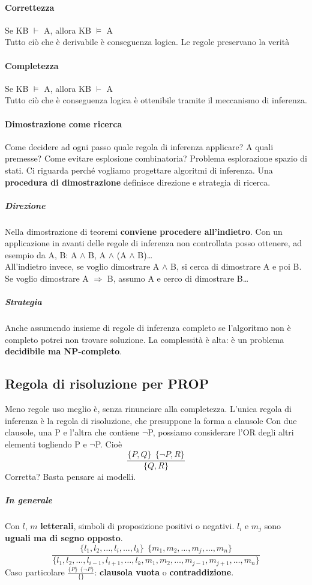 \documentclass[10pt]{book}
\begin{document}
\paragraph{Correttezza} Se KB $\vdash$ A, allora KB $\vDash$ A\\
Tutto ciò che è derivabile è conseguenza logica. Le regole preservano la verità
\paragraph{Completezza} Se KB $\vDash$ A, allora KB $\vdash$ A\\
Tutto ciò che è conseguenza logica è ottenibile tramite il meccanismo di inferenza.\\
\paragraph{Dimostrazione come ricerca}
Come decidere ad ogni passo quale regola di inferenza applicare? A quali premesse? Come evitare esplosione combinatoria? Problema esplorazione spazio di stati. Ci riguarda perché vogliamo progettare algoritmi di inferenza. Una \textbf{procedura di dimostrazione} definisce direzione e strategia di ricerca.
\subparagraph{Direzione} Nella dimostrazione di teoremi \textbf{conviene procedere all'indietro}. Con un applicazione in avanti delle regole di inferenza non controllata posso ottenere, ad esempio da A, B: A $\wedge$ B, A $\wedge$ (A $\wedge$ B)\ldots\\
All'indietro invece, se voglio dimostrare A $\wedge$ B, si cerca di dimostrare A e poi B. Se voglio dimostrare A $\Rightarrow$ B, assumo A e cerco di dimostrare B\ldots
\subparagraph{Strategia} Anche assumendo insieme di regole di inferenza completo se l'algoritmo non è completo potrei non trovare soluzione. La complessità è alta: è un problema \textbf{decidibile ma NP-completo}.
\subsection{Regola di risoluzione per PROP} Meno regole uso meglio è, senza rinunciare alla completezza. L'unica regola di inferenza è la regola di risoluzione, che presuppone la forma a clausole
Con due clausole, una P e l'altra che contiene $\neg$P, possiamo considerare l'OR degli altri elementi togliendo P e $\neg$P. Cioè $$\frac{\{P, Q\}\:\:\{\neg P, R\}}{\{Q, R\}}$$ Corretta? Basta pensare ai modelli.
\subparagraph{In generale} Con $l$, $m$ \textbf{letterali}, simboli di proposizione positivi o negativi. $l_i$ e $m_j$ sono \textbf{uguali ma di segno opposto}.
$$\frac{\{l_1, l_2,\ldots, l_i, \ldots, l_k\}\:\:\{m_1, m_2, \ldots, m_j, \ldots, m_n\}}{\{l_1, l_2,\ldots, l_{i-1}, l_{i+1}, \ldots, l_k, m_1, m_2, \ldots, m_{j-1}, m_{j+1}, \ldots, m_n\}}$$
Caso particolare $\frac{\{P\}\:\:\{\neg P\}}{\{\}}$: \textbf{clausola vuota} o \textbf{contraddizione}.
\end{document}
